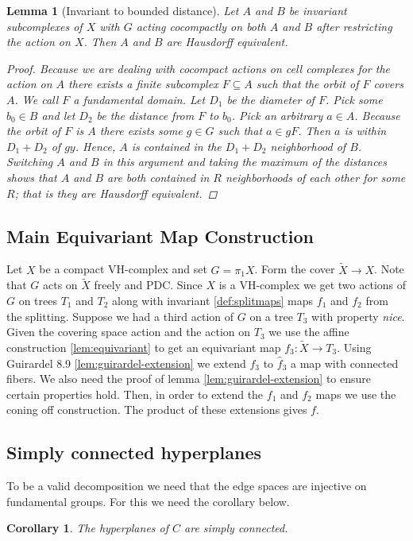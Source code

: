 \documentclass{article}
\theoremstyle{mystyle}
\newtheorem{lem}{Lemma}[section]
\newtheorem*{cor*}{Corollary}
\theoremstyle{remark}
\begin{document}
\begin{lem}
    [Invariant to bounded distance]
    Let \(A\) and \(B\) be invariant subcomplexes of \(X\) with \(G\) acting cocompactly on both \(A\) and \(B\) after restricting the action on \(X\). Then \(A\) and \(B\) are Hausdorff equivalent. 
    \begin{proof}
        Because we are dealing with cocompact actions on cell complexes for the action on \(A\) there exists a finite subcomplex \(F \subseteq A\) such that the orbit of \(F\) covers \(A\). We call \(F\) a fundamental domain. Let \(D_{1}\) be the diameter of \(F\). Pick some \(b_{0} \in B\) and let \(D_{2}\) be the distance from \(F\) to \(b_{0}\). Pick an arbitrary \(a \in A\). Because the orbit of \(F\) is \(A\) there exists some \(g \in G\) such that \(a \in gF\). Then \(a\) is within \(D_{1} + D_{2}\) of \(g y\). Hence, \(A\) is contained in the \(D_{1} + D_{2}\) neighborhood of \(B\). Switching \(A\) and \(B\) in this argument and taking the maximum of the distances shows that \(A\) and \(B\) are both contained in \(R\) neighborhoods of each other for some \(R\); that is they are Hausdorff equivalent.
    \end{proof}
\end{lem}


\subsection{Main Equivariant Map Construction}
Let \(X\) be a compact VH-complex and set \(G= \pi_{1} X\). Form the cover \(\widetilde{X} \to X\). Note that \(G\) acts on \(\widetilde X\) freely and PDC. Since \(X\) is a VH-complex we get two actions of \(G\) on trees \(T_{1}\) and \(T_{2}\) along with invariant \ref{def:splitmaps} maps \(f_{1}\) and \(f_{2}\) from the splitting. Suppose we had a third action of \(G\) on a tree \(T_{3}\) with property {\em nice}. Given the covering space action and the action on \(T_{3}\) we use the affine construction \ref{lem:equivariant} to get an equivariant map \(f_{3} : \widetilde X \to T_{3}\). Using Guirardel 8.9 \ref{lem:guirardel-extension} we extend \(f_{3}\) to \(\widehat f_{3}\) a map with connected fibers. We also need the proof of lemma \ref{lem:guirardel-extension} to ensure certain properties hold. Then, in order to extend the \(f_{1}\) and \(f_{2}\) maps we use the coning off construction. The product of these extensions gives \(f\).
    
    \subsection{Simply connected hyperplanes}
    To be a valid decomposition we need that the edge spaces are injective on fundamental groups. For this we need the corollary below.
\begin{cor*}
    The hyperplanes of \(C\) are simply connected. 
\end{cor*}
\end{document}
